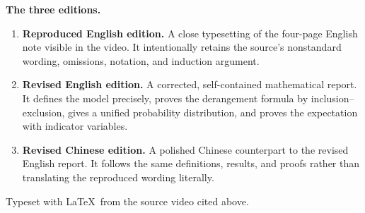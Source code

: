 \begin{titlepage}
\begin{minipage}{0.86\textwidth}
\medskip
\textbf{The three editions.}
\begin{enumerate}
  \item \textbf{Reproduced English edition.}
    A close typesetting of the four-page English note visible in the video.
    It intentionally retains the source's nonstandard wording, omissions,
    notation, and induction argument.

  \item \textbf{Revised English edition.}
    A corrected, self-contained mathematical report. It defines the model
    precisely, proves the derangement formula by inclusion--exclusion, gives
    a unified probability distribution, and proves the expectation with
    indicator variables.

  \item \textbf{Revised Chinese edition.}
    A polished Chinese counterpart to the revised English report. It follows
    the same definitions, results, and proofs rather than translating the
    reproduced wording literally.
\end{enumerate}

\medskip
\noindent
{}

\end{minipage}

\vfill
{\small Typeset with \LaTeX\ from the source video cited above.\par}

\end{titlepage}
\hypersetup{pageanchor=true}

